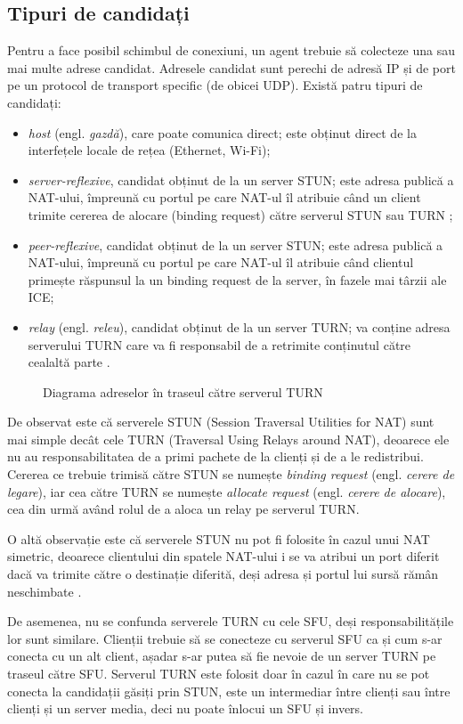 \subsection{Tipuri de candidați}
\indent \par Pentru a face posibil schimbul de conexiuni, un agent trebuie să colecteze una sau mai multe adrese candidat. Adresele candidat sunt perechi de adresă IP și de port pe un protocol de transport specific (de obicei UDP). Există patru tipuri de candidați:
\begin{itemize}
    \item \textit{host} (engl. \textit{gazdă}), care poate comunica direct; este obținut direct de la interfețele locale de rețea (Ethernet, Wi-Fi);
    \item \textit{server-reflexive}, candidat obținut de la un server STUN; este adresa publică a NAT-ului, împreună cu portul pe care NAT-ul îl atribuie când un client trimite cererea de alocare (binding request) către serverul STUN sau TURN \cite{rfc5245};
    \item \textit{peer-reflexive}, candidat obținut de la un server STUN; este adresa publică a NAT-ului, împreună cu portul pe care NAT-ul îl atribuie când clientul primește răspunsul la un binding request de la server, în fazele mai târzii ale ICE;
    \item \textit{relay} (engl. \textit{releu}), candidat obținut de la un server TURN; va conține adresa serverului TURN care va fi responsabil de a retrimite conținutul către cealaltă parte \cite{rfc5245}.
\end{itemize}
\begin{figure}[H]
    \centering
    \scalebox{0.7}{}
    \caption{Diagrama adreselor în traseul către serverul TURN}
\end{figure}
\indent \par De observat este că serverele STUN (Session Traversal Utilities for NAT) sunt mai simple decât cele TURN (Traversal Using Relays around NAT), deoarece ele nu au responsabilitatea de a primi pachete de la clienți și de a le redistribui. Cererea ce trebuie trimisă către STUN se numește \textit{binding request} (engl. \textit{cerere de legare}), iar cea către TURN se numește \textit{allocate request} (engl. \textit{cerere de alocare}), cea din urmă având rolul de a aloca un relay pe serverul TURN. 
\indent \par O altă observație este că serverele STUN nu pot fi folosite în cazul unui NAT simetric, deoarece clientului din spatele NAT-ului i se va atribui un port diferit dacă va trimite către o destinație diferită, deși adresa și portul lui sursă rămân neschimbate \cite{rfc5389}.
\indent \par De asemenea, nu se confunda serverele TURN cu cele SFU, deși responsabilitățile lor sunt similare. Clienții trebuie să se conecteze cu serverul SFU ca și cum s-ar conecta cu un alt client, așadar s-ar putea să fie nevoie de un server TURN pe traseul către SFU. Serverul TURN este folosit doar în cazul în care nu se pot conecta la candidații găsiți prin STUN, este un intermediar între clienți sau între clienți și un server media, deci nu poate înlocui un SFU și invers.
